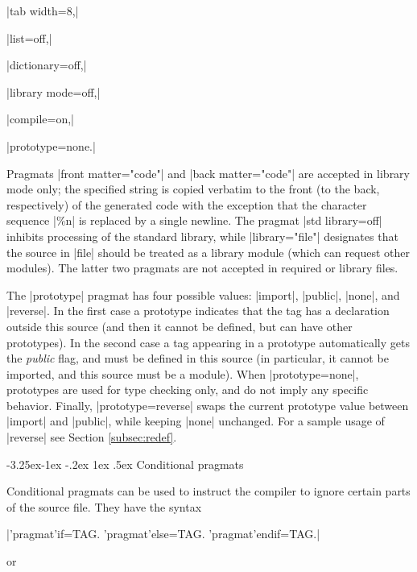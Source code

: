 \documentclass[titlepage]{article}
\makeatletter
\newcommand\g[1]{\textsf{\color{blue!90!black}#1}}
\renewcommand\subsection{%
\@startsection{subsection}{2}{\z@}%
   {-3.25ex\@plus -1ex \@minus -.2ex}%
   {1ex \@plus .5ex}%
   {\normalfont\normalsize\bfseries}}
\makeatother
\begin{document}
\HH\pp|tab width=8,|\HE

\HH\pp|list=off,|\HE

\HH\pp|dictionary=off,|\HE

\HH\pp|library mode=off,|\HE

\HH\pp|compile=on,|\HE

\HH\pp|prototype=none.|\HE

\smallskip
Pragmats \pp|front matter="code"|  and \pp|back matter="code"| are accepted
in library mode only; the specified string is copied verbatim to the front
(to the back, respectively) of the generated code with the exception that
the character sequence \pp|\%n| is replaced by a single newline. The pragmat
\pp|std library=off| inhibits processing of the standard library, while
\pp|library="file"| designates that the source in \pp|file| should be
treated as a library module (which can request other modules). The latter
two pragmats are not accepted in required or library files.

The \pp|prototype| pragmat has four possible values: \pp|import|,
\pp|public|, \pp|none|, and \pp|reverse|. In the first case a \g{prototype}
indicates that the tag has a declaration outside this source (and then it
cannot be defined, but can have other prototypes). In the second case a tag
appearing in a \g{prototype} automatically gets the \emph{public} flag, and
must be defined in this source (in particular, it cannot be imported, and
this source must be a module). When
\pp|prototype=none|, prototypes are used for type checking only, and do
not imply any specific behavior. Finally, \pp|prototype=reverse| swaps the
current prototype value between \pp|import| and \pp|public|, while keeping
\pp|none| unchanged. For a sample usage of \pp|reverse| see Section
 \ref{subsec:redef}.


\subsection{Conditional pragmats}\label{conditional}

Conditional pragmats can be used to instruct the compiler to ignore certain
parts of the source file. They have the syntax

\medskip

\pp|'pragmat'if=TAG.     'pragmat'else=TAG.   'pragmat'endif=TAG.|

\noindent or
\end{document}
